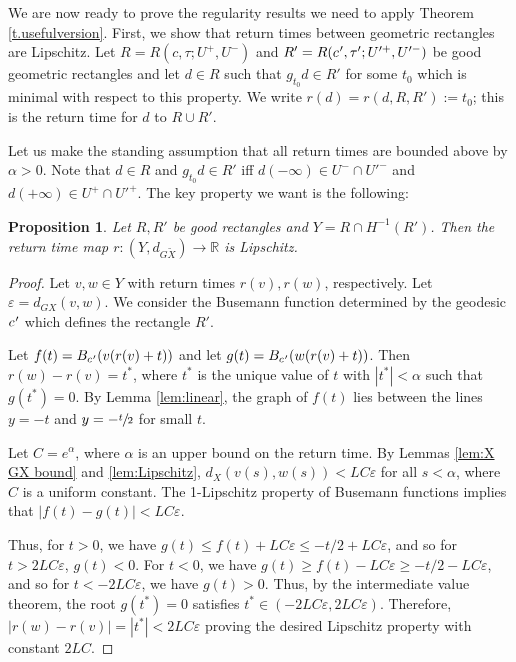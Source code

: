 \documentclass[10pt]{amsart}
\let\epsilon\varepsilon
\newcommand{\cpr}{c\mkern1mu'}
\newtheorem{prop}[thm]{Proposition}
\theoremstyle{definition}
\numberwithin{equation}{section}
\begin{document}
We are now ready to prove the regularity results we need to apply Theorem \ref{t.usefulversion}. First, we show that return times between geometric rectangles are Lipschitz. Let $R=R(c, \tau; U^+, U^-)$ and $R'=R(\cpr, \tau'; U'^+, U'^-)$ be good geometric rectangles and let $d\in R$ such that $g_{t_0}d \in R'$ for some $t_0$ which is minimal with respect to this property. We write $r(d)=r(d, R, R') :=t_0$; this is the return time for $d$ to $R \cup R'$.

Let us make the standing assumption that all return times are bounded above by $\alpha>0$. Note that $d\in R$ and $g_{t_0}d \in R'$ iff $d(-\infty)\in U^-\cap U'^-$ and $d(+\infty)\in U^+\cap U'^+$. The key property we want is the following:

\begin{prop}\label{prop:Lipschitz}
Let $R, R'$ be good rectangles and $Y= R \cap H^{-1}(R')$. Then the return time map $r:(Y, d_{G\tilde X}) \to \mathbb{R}$ is Lipschitz.
\end{prop}

\begin{proof}

Let $v,w \in Y$ with return times $r(v), r(w)$, respectively. Let $\epsilon = d_{GX}(v,w)$. We consider the Busemann function determined by the geodesic $\cpr$ which defines the rectangle $R'$.

Let $f(t) = B_{\cpr}(v(r(v)+t))$ and let $g(t) = B_{\cpr}(w(r(v)+t))$. Then $r(w)-r(v) = t^*$, where $t^*$ is the unique value of $t$ with $|t^\ast|< \alpha$ such that $g(t^\ast) = 0$. By Lemma \ref{lem:linear}, the graph of $f(t)$ lies between the lines $y=-t$ and $y=-\sfrac{t}{2}$ for small $t$.

Let $C = e^\alpha$, where $\alpha$ is an upper bound on the return time. By Lemmas \ref{lem:X GX bound} and \ref{lem:Lipschitz}, $d_X(v(s), w(s))<LC\epsilon$ for all $s<\alpha$, where $C$ is a uniform constant. The 1-Lipschitz property of Busemann functions implies that $|f(t)-g(t)| < LC\epsilon$.

Thus, for $t>0$, we have $g(t)\leq f(t)+LC \epsilon \leq -t/2 +LC\epsilon$, and so for $t>2LC \epsilon$, $g(t)<0$. For $t<0$, we have $g(t) \geq f(t)-LC \epsilon \geq -t/2-LC \epsilon$, and so for $t<-2LC \epsilon$, we have $g(t)>0$. Thus, by the intermediate value theorem, the root $g(t^\ast)=0$ satisfies $t^\ast \in (-2LC\epsilon, 2LC \epsilon)$. Therefore, $|r(w)-r(v)| = |t^\ast| < 2LC\epsilon$ proving the desired Lipschitz property with constant $2LC$.
\end{proof}
\end{document}
